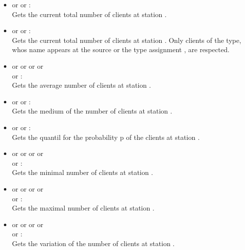 \begin{itemize}

\item
{} or  or :\\
Gets the current total number of clients at station .

\item
{} or  or :\\
Gets the current total number of clients at station .
Only clients of the type, whos name appears at the source or the type assignment , are respected.

\item
{} or  or  or  or\\
 or :\\
Gets the average number of clients at station .

\item
{} or  or :\\
Gets the medium of the number of clients at station .

\item
{} or  or :\\
Gets the quantil for the probability p of the clients at station .

\item
{} or  or  or  or\\
 or :\\
Gets the minimal number of clients at station .

\item
{} or  or  or  or\\
 or :\\
Gets the maximal number of clients at station .

\item
{} or  or  or  or\\
 or :\\
Gets the variation of the number of clients at station .


\end{itemize}
